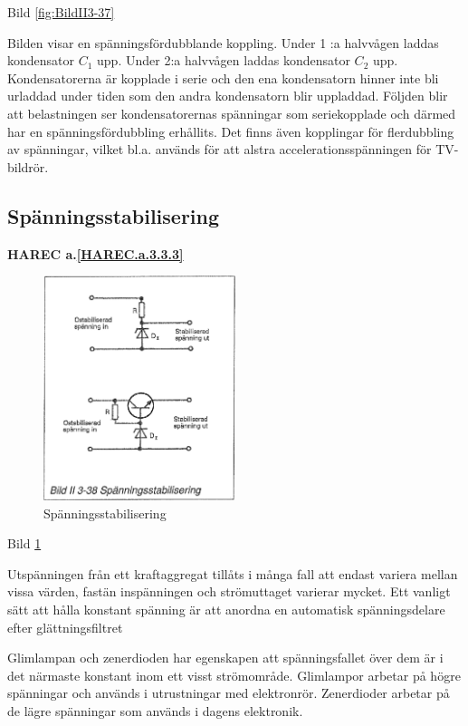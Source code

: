 Bild \ref{fig:BildII3-37}

Bilden visar en spänningsfördubblande koppling. Under 1 :a halvvågen
laddas kondensator \(C_1\) upp. Under 2:a halvvågen laddas kondensator
\(C_2\) upp. Kondensatorerna är kopplade i serie och den ena
kondensatorn hinner inte bli urladdad under tiden som den andra
kondensatorn blir uppladdad. Följden blir att belastningen ser
kondensatorernas spänningar som seriekopplade och därmed har en
spänningsfördubbling erhållits. Det finns även kopplingar för
flerdubbling av spänningar, vilket bl.a. används för att alstra
accelerationsspänningen för TV-bildrör.

\subsection{Spänningsstabilisering}
\textbf{HAREC a.\ref{HAREC.a.3.3.3}\label{myHAREC.a.3.3.3}}

\begin{figure}
\includegraphics[width=0.5\textwidth]{images/bild_2_3-38}
\caption{Spänningsstabilisering}
\label{fig:BildII3-38}
\end{figure}

Bild \ref{fig:BildII3-38}

Utspänningen från ett kraftaggregat tillåts i många fall att endast
variera mellan vissa värden, fastän inspänningen och strömuttaget
varierar mycket. Ett vanligt sätt att hålla konstant spänning är att
anordna en automatisk spänningsdelare efter glättningsfiltret

Glimlampan och zenerdioden har egenskapen att spänningsfallet över dem
är i det närmaste konstant inom ett visst strömområde. Glimlampor
arbetar på högre spänningar och används i utrustningar med
elektronrör. Zenerdioder arbetar på de lägre spänningar som används i
dagens elektronik.

